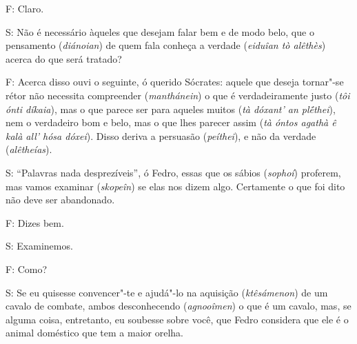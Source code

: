F: Claro.

S: Não é necessário àqueles que desejam falar bem e de modo belo, que o
pensamento (\emph{diánoian}) de quem fala conheça a verdade
(\emph{eiduîan tò alêthès}) acerca do que será tratado?

\bekker{[260a]} F: Acerca disso ouvi o seguinte, ó querido Sócrates: aquele
que deseja tornar"-se rétor não necessita compreender (\emph{manthánein})
o que é verdadeiramente justo (\emph{tôi ónti díkaia}), mas o que parece
ser para aqueles muitos (\emph{tà dóxant' an plḗthei}), nem o verdadeiro
bom e belo, mas o que lhes parecer assim (\emph{tà óntos agathà ê kalà
all' hósa dóxei}). Disso deriva a persuasão (\emph{peíthei}), e não da
verdade (\emph{alêtheías}).

S: ``Palavras nada desprezíveis'', ó Fedro, essas que os sábios (\emph{sophoí}) proferem,
mas vamos examinar (\emph{skopeîn}) se elas nos dizem algo. Certamente o
que foi dito não deve ser abandonado.

F: Dizes bem.

S: Examinemos.

F: Como?

\bekker{[260b]} S: Se eu quisesse convencer"-te e ajudá"-lo na aquisição
(\emph{ktêsámenon}) de um cavalo de combate, ambos desconhecendo
(\emph{agnooîmen}) o que é um cavalo, mas, se alguma coisa, entretanto,
eu soubesse sobre você, que Fedro considera que ele é o animal doméstico
que tem a maior orelha.

